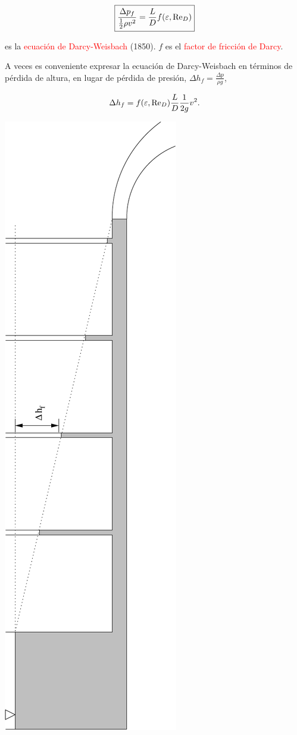 \begin{equation}
	\boxed{
	\frac{\Delta p_f}{\frac{1}{2} \rho v^2} = \frac{L}{D} f(\varepsilon,\text{Re}_D)
}
\end{equation}

es la \textcolor{red}{ecuación de Darcy-Weisbach} (1850). $f$ es el \textcolor{red}{factor de fricción de Darcy}.


A veces es conveniente expresar la ecuación de Darcy-Weisbach en términos  de pérdida de altura, en lugar de pérdida de presión, $\Delta h_f = \frac{\Delta p}{\rho g}$,

\begin{equation}
	\Delta h_f = f(\varepsilon,\text{Re}_D) \frac{L}{D} \frac{1}{2g}v^2.
\end{equation}


\begin{center}
	\includegraphics[scale=0.9,angle=270]{TeX_files/chapter10-Tuberias/alturas1.pdf}

\end{center}
